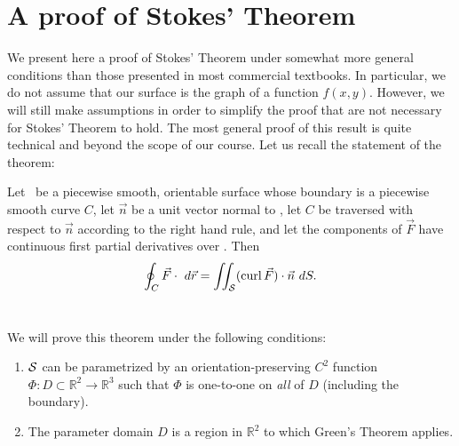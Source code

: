 \section{A proof of Stokes' Theorem}\label{sec:stokes_proof}
We present here a proof of Stokes' Theorem under somewhat more general conditions than those presented in most commercial textbooks. In particular, we do not assume that our surface is the graph of a function $f(x,y)$. However, we will still make assumptions in order to simplify the proof that are not necessary for Stokes' Theorem to hold. The most general proof of this result is quite technical and beyond the scope of our course.  Let us recall the statement of the theorem:

{Let \surfaceS\ be a piecewise smooth, orientable surface whose boundary is a piecewise smooth curve $C$, let $\vec n$ be a unit vector normal to \surfaceS, let $C$ be traversed with respect to $\vec n$ according to the right hand rule, and let the components of $\vec F$ have continuous first partial derivatives over \surfaceS. Then
\[
\oint_C \vec F\cdot \ d\vec r = \iint_{\mathcal{S}} (\operatorname{curl}\vec F)\cdot \vec n\ dS.
\]
}\\


We will prove this theorem under the following conditions:
\begin{enumerate}
 \item $\mathcal{S}$ can be parametrized by an orientation-preserving $C^2$ function $\Phi:D\subset \mathbb{R}^2\to \mathbb{R}^3$ such that $\Phi$ is one-to-one on {\em all} of $D$ (including the boundary).
 \item The parameter domain $D$ is a region in $\mathbb{R}^2$ to which Green's Theorem applies.
\end{enumerate}

